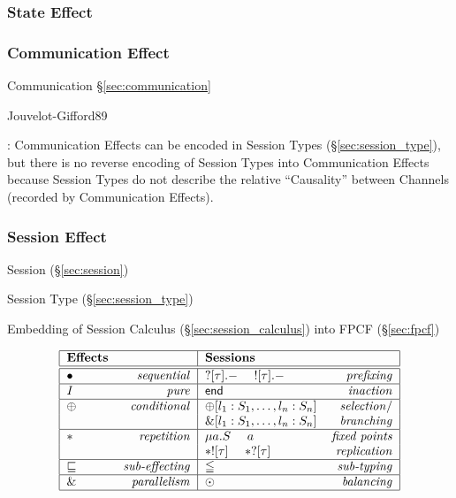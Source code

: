 \subsubsection{State Effect}\label{sec:state_effect}

\subsubsection{Communication Effect}\label{sec:communication_effect}

Communication \S\ref{sec:communication}

Jouvelot-Gifford89

\cite{nielson-nielson99}

\cite{orchard-yoshida16}: Communication Effects can be encoded in
Session Types (\S\ref{sec:session_type}), but there is no reverse
encoding of Session Types into Communication Effects because Session
Types do not describe the relative ``Causality'' between Channels
(recorded by Communication Effects).



\subsubsection{Session Effect}\label{sec:session_effect}

Session (\S\ref{sec:session})

Session Type (\S\ref{sec:session_type})

Embedding of Session Calculus (\S\ref{sec:session_calculus}) into FPCF
(\S\ref{sec:fpcf})

\[
  \begin{tabular}{|l r|l r|}
    \hline \textbf{Effects} & & \textbf{Sessions} & \\
    \hline \hline
      $\bullet$ & \emph{sequential}
        & $?[\tau].-$ \quad $![\tau].-$ & \emph{prefixing} \\
    \hline
      $I$ & \emph{pure} & $\mathsf{end}$ & \emph{inaction} \\
    \hline
      $\oplus$ & \emph{conditional}
        & $\oplus[l_1:S_1, \ldots, l_n:S_n]$ & \emph{selection}/ \\
      \hfill & \hfill
        & $\&[l_1:S_1, \ldots, l_n:S_n]$ & \emph{branching} \\
    \hline
      $*$ & \emph{repetition}
        & $\mu a.S$ \quad $a$ & \emph{fixed points} \\
      \hfil & \hfill
        & $*![\tau]$ \quad $*?[\tau]$ & \emph{replication} \\
    \hline
      $\sqsubseteq$ & \emph{sub-effecting}
        & $\leqq$ & \emph{sub-typing} \\
    \hline
      $\&$ & \emph{parallelism} & $\odot$ & \emph{balancing} \\
    \hline
  \end{tabular}
\]


